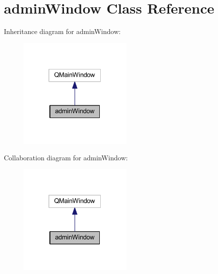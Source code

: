 \hypertarget{classadmin_window}{}\section{admin\+Window Class Reference}
\label{classadmin_window}


Inheritance diagram for admin\+Window\+:\nopagebreak
\begin{figure}[H]
\begin{center}
\leavevmode
\includegraphics[width=160pt]{classadmin_window__inherit__graph}
\end{center}
\end{figure}


Collaboration diagram for admin\+Window\+:\nopagebreak
\begin{figure}[H]
\begin{center}
\leavevmode
\includegraphics[width=160pt]{classadmin_window__coll__graph}
\end{center}
\end{figure}
